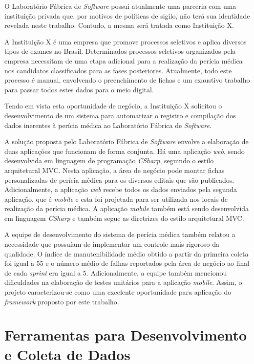 O Laboratório Fábrica de \textit{Software} possui atualmente uma parceria com uma instituição privada que, por motivos de políticas de sigilo, não terá sua identidade revelada neste trabalho. Contudo, a mesma será tratada como Instituição X.

A Instituição X é uma empresa que promove processos seletivos e aplica diversos tipos de exames no Brasil. Determinados processos seletivos organizados pela empresa necessitam de uma etapa adicional para a realização da perícia médica nos candidatos classificados para as fases posteriores. Atualmente, todo este processo é manual, envolvendo o preenchimento de fichas e um exaustivo trabalho para passar todos estes dados para o meio digital.

Tendo em vista esta oportunidade de negócio, a Instituição X solicitou o desenvolvimento de um sistema para automatizar o registro e compilação dos dados inerentes à perícia médica ao Laboratório Fábrica de \textit{Software}.

A solução proposta pelo Laboratório Fábrica de \textit{Software} envolve a elaboração de duas aplicações que funcionam de forma conjunta. Há uma aplicação \textit{web}, sendo desenvolvida em linguagem de programação \textit{CSharp}, seguindo o estilo arquitetural MVC. Nesta aplicação, a área de negócio pode montar fichas personalizadas de perícia médica para os diversos editais que são publicados. Adicionalmente, a aplicação \textit{web} recebe todos os dados enviados pela segunda aplicação, que é \textit{mobile} e esta foi projetada para ser utilizada nos locais de realização da perícia médica. A aplicação \textit{mobile} também está sendo desenvolvida em linguagem \textit{CSharp} e também segue as diretrizes do estilo arquitetural MVC.

A equipe de desenvolvimento do sistema de perícia médica também relatou a necessidade que possuíam de implementar um controle mais rigoroso da qualidade. O índice de manutenibilidade médio obtido a partir da primeira coleta foi igual a 55 e o número médio de falhas reportados pela área de negócio ao final de cada \textit{sprint} era igual a 5. Adicionalmente, a equipe também mencionou dificuldades na elaboração de testes unitários para a aplicação \textit{mobile}. Assim, o projeto caracterizou-se como uma excelente oportunidade para aplicação do \textit{framework} proposto por este trabalho.

\clearpage

\section{Ferramentas para Desenvolvimento e Coleta de Dados}

